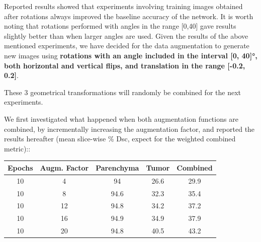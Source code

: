Reported results showed that experiments involving training images
obtained after rotations always improved the baseline accuracy of the
network. It is worth noting that rotations performed with angles in the
range {[}0,40{]} gave results slightly better than when larger angles are used.
Given the results of the above mentioned experiments, we have decided
for the data augmentation to generate new images using \textbf{rotations
with an angle included in the interval {[}0, 40{]}°, both horizontal and
vertical flips, and translation in the range {[}-0.2, 0.2{]}}.

These 3 geometrical transformations will randomly be combined for the
next experiments.

%

We first investigated what happened when both augmentation functions are
combined, by incrementally increasing the augmentation factor, and
reported the results hereafter (mean slice-wise \% Dsc, expect for the weighted combined metric)::

\begin{longtable}[c]{@{}ccccc@{}}
\toprule
\textbf{Epochs} & \textbf{Augm. Factor} & \textbf{Parenchyma} &
\textbf{Tumor} & \textbf{Combined}\tabularnewline
\midrule
\endhead
10 & 4 & 94 & 26.6 & 29.9\tabularnewline
10 & 8 & 94.6 & 32.3 & 35.4\tabularnewline
10 & 12 & 94.8 & 34.2 & 37.2\tabularnewline
10 & 16 & 94.9 & 34.9 & 37.9\tabularnewline
10 & 20 & 94.8 & 40.5 & 43.2\tabularnewline
\bottomrule
\end{longtable}

